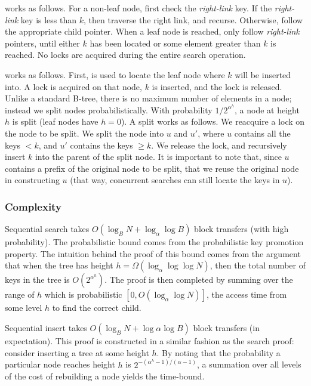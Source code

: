 \documentclass[preprint]{style}
\begin{document}
\Search{} works as follows. For a non-leaf node, first check the
\textit{right-link} key. If the \textit{right-link} key is less than $k$, then
traverse the right link, and recurse. Otherwise, follow the appropriate child
pointer. When a leaf node is reached, only follow \textit{right-link}
pointers, until either $k$ has been located or some element greater than $k$
is reached. No locks are acquired during the entire search operation.

\Insert{} works as follows. First, \Search{} is used to locate the leaf node
where $k$ will be inserted into. A lock is acquired on that node, $k$ is
inserted, and the lock is released. Unlike a standard B-tree, there is no
maximum number of elements in a node; instead we split nodes
probabilistically. With probability ${1}/{2^{\alpha^h}}$, a node at height $h$
is split (leaf nodes have $h = 0$). A split works as follows. We reacquire a
lock on the node to be split. We split the node into $u$ and $u'$, where $u$
contains all the keys $< k$, and $u'$ contains the keys $\geq k$. We release
the lock, and recursively insert $k$ into the parent of the split node. It is
important to note that, since $u$ contains a prefix of the original node to be
split, that we reuse the original node in constructing $u$ (that way,
concurrent searches can still locate the keys in $u$).


\subsubsection{Complexity}

Sequential search takes $O(\log_B{N} + \log_{\alpha}{\log{B}})$ block transfers
(with high probability). The probabilistic bound comes from the probabilistic
key promotion property. The intuition behind the proof of this bound comes from
the argument that when the tree has height $h =
\Omega(\log_{\alpha}{\log{\log{N}}})$, then the total number of keys in the
tree is $O(2^{\alpha^h})$. The proof is then completed by summing over the
range of $h$ which is probabilistic $[0, O(\log_{\alpha}{\log{N}})]$, the
access time from some level $h$ to find the correct child.

Sequential insert takes $O(\log_B{N} + \log{\alpha}{\log{B}})$ block
transfers (in expectation). This proof is constructed in a similar fashion as
the search proof: consider inserting a tree at some height $h$. By noting that
the probability a particular node reaches height $h$ is
$2^{-(\alpha^h-1)/(\alpha-1)}$, a summation over all levels of the cost of
rebuilding a node yields the time-bound.
\end{document}

